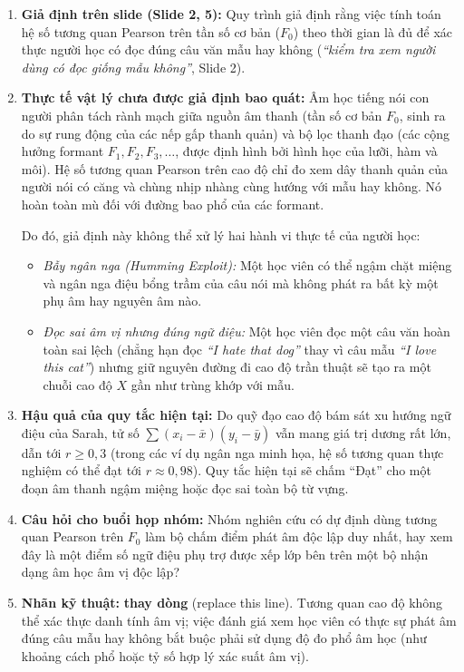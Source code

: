 \documentclass[11pt,a4paper]{article}
\begin{document}
\begin{enumerate}
    \item \textbf{Giả định trên slide (Slide 2, 5):} Quy trình giả định rằng việc tính toán hệ số tương quan Pearson trên tần số cơ bản ($F_0$) theo thời gian là đủ để xác thực người học có đọc đúng câu văn mẫu hay không (\textit{``kiểm tra xem người dùng có đọc giống mẫu không''}, Slide 2).
    \item \textbf{Thực tế vật lý chưa được giả định bao quát:} Âm học tiếng nói con người phân tách rành mạch giữa nguồn âm thanh (tần số cơ bản $F_0$, sinh ra do sự rung động của các nếp gấp thanh quản) và bộ lọc thanh đạo (các cộng hưởng formant $F_1, F_2, F_3, \dots$, được định hình bởi hình học của lưỡi, hàm và môi). Hệ số tương quan Pearson trên cao độ chỉ đo xem dây thanh quản của người nói có căng và chùng nhịp nhàng cùng hướng với mẫu hay không. Nó hoàn toàn mù đối với đường bao phổ của các formant.

    Do đó, giả định này không thể xử lý hai hành vi thực tế của người học:
    \begin{itemize}
        \item \textit{Bẫy ngân nga (Humming Exploit):} Một học viên có thể ngậm chặt miệng và ngân nga điệu bổng trầm của câu nói mà không phát ra bất kỳ một phụ âm hay nguyên âm nào.
        \item \textit{Đọc sai âm vị nhưng đúng ngữ điệu:} Một học viên đọc một câu văn hoàn toàn sai lệch (chẳng hạn đọc \textit{``I hate that dog''} thay vì câu mẫu \textit{``I love this cat''}) nhưng giữ nguyên đường đi cao độ trần thuật sẽ tạo ra một chuỗi cao độ $X$ gần như trùng khớp với mẫu.
    \end{itemize}
    \item \textbf{Hậu quả của quy tắc hiện tại:} Do quỹ đạo cao độ bám sát xu hướng ngữ điệu của Sarah, tử số $\sum (x_i - \bar{x})(y_i - \bar{y})$ vẫn mang giá trị dương rất lớn, dẫn tới $r \ge 0{,}3$ (trong các ví dụ ngân nga minh họa, hệ số tương quan thực nghiệm có thể đạt tới $r \approx 0{,}98$). Quy tắc hiện tại sẽ chấm ``Đạt'' cho một đoạn âm thanh ngậm miệng hoặc đọc sai toàn bộ từ vựng.
    \item \textbf{Câu hỏi cho buổi họp nhóm:} Nhóm nghiên cứu có dự định dùng tương quan Pearson trên $F_0$ làm bộ chấm điểm phát âm độc lập duy nhất, hay xem đây là một điểm số ngữ điệu phụ trợ được xếp lớp bên trên một bộ nhận dạng âm học âm vị độc lập?
    \item \textbf{Nhãn kỹ thuật:} \textbf{thay dòng} (replace this line). Tương quan cao độ không thể xác thực danh tính âm vị; việc đánh giá xem học viên có thực sự phát âm đúng câu mẫu hay không bắt buộc phải sử dụng độ đo phổ âm học (như khoảng cách phổ hoặc tỷ số hợp lý xác suất âm vị).
\end{enumerate}
\end{document}
